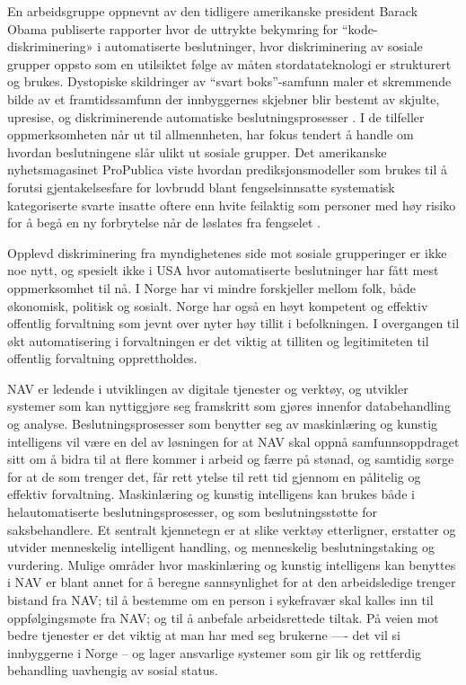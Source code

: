 \documentclass[
]{book}
\begin{document}
En arbeidsgruppe oppnevnt av den tidligere amerikanske president Barack Obama publiserte rapporter hvor de uttrykte bekymring for ``kode-diskriminering» i automatiserte beslutninger, hvor diskriminering av sosiale grupper oppsto som en utilsiktet følge av måten stordatateknologi er strukturert og brukes.
Dystopiske skildringer av ``svart boks''-samfunn maler et skremmende bilde av et framtidssamfunn der innbyggernes skjebner blir bestemt av skjulte, upresise, og diskriminerende automatiske beslutningsprosesser \citep{barocas2016big, pasquale2015black}.
I de tilfeller oppmerksomheten når ut til allmennheten, har fokus tendert å handle om hvordan beslutningene slår ulikt ut sosiale grupper.
Det amerikanske nyhetsmagasinet ProPublica viste hvordan prediksjonsmodeller som brukes til å forutsi gjentakelsesfare for lovbrudd blant fengselsinnsatte systematisk kategoriserte svarte insatte oftere enn hvite feilaktig som personer med høy risiko for å begå en ny forbrytelse når de løslates fra fengselet \citep{angwin2016machine}.

Opplevd diskriminering fra myndighetenes side mot sosiale grupperinger er ikke noe nytt, og spesielt ikke i USA hvor automatiserte beslutninger har fått mest oppmerksomhet til nå.
I Norge har vi mindre forskjeller mellom folk, både økonomisk, politisk og sosialt.
Norge har også en høyt kompetent og effektiv offentlig forvaltning som jevnt over nyter høy tillit i befolkningen.
I overgangen til økt automatisering i forvaltningen er det viktig at tilliten og legitimiteten til offentlig forvaltning opprettholdes.

NAV er ledende i utviklingen av digitale tjenester og verktøy\citep{hansen2018digitalization}, og utvikler systemer som kan nyttiggjøre seg framskritt som gjøres innenfor databehandling og analyse.
Beslutningsprosesser som benytter seg av maskinlæring og kunstig intelligens vil være en del av løsningen for at NAV skal oppnå samfunnsoppdraget sitt om å bidra til at flere kommer i arbeid og færre på stønad, og samtidig sørge for at de som trenger det, får rett ytelse til rett tid gjennom en pålitelig og effektiv forvaltning.
Maskinlæring og kunstig intelligens kan brukes både i helautomatiserte beslutningsprosesser, og som beslutningsstøtte for saksbehandlere.
Et sentralt kjennetegn er at slike verktøy etterligner, erstatter og utvider menneskelig intelligent handling, og menneskelig beslutningstaking og vurdering.
Mulige områder hvor maskinlæring og kunstig intelligens kan benyttes i NAV er blant annet for å beregne sannsynlighet for at den arbeidsledige trenger bistand fra NAV; til å bestemme om en person i sykefravær skal kalles inn til oppfølgingsmøte fra NAV; og til å anbefale arbeidsrettede tiltak.
På veien mot bedre tjenester er det viktig at man har med seg brukerne ---- det vil si innbyggerne i Norge -- og lager ansvarlige systemer som gir lik og rettferdig behandling uavhengig av sosial status.
\end{document}
